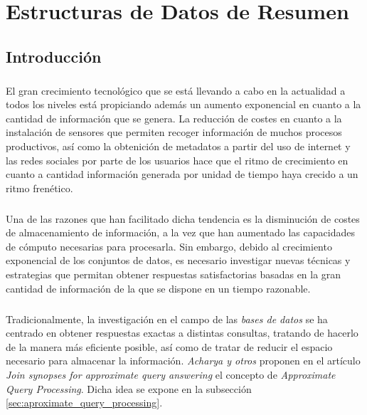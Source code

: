 \documentclass{subfiles}
\begin{document}
  \chapter{Estructuras de Datos de Resumen}
  \label{chapter:summaries}

    \section{Introducción}
    \label{sec:summaries_intro}

      \paragraph{}
      El gran crecimiento tecnológico que se está llevando a cabo en la actualidad a todos los niveles está propiciando además un aumento exponencial en cuanto a la cantidad de información que se genera. La reducción de costes en cuanto a la instalación de sensores que permiten recoger información de muchos procesos productivos, así como la obtenición de metadatos a partir del uso de internet y las redes sociales por parte de los usuarios hace que el ritmo de crecimiento en cuanto a cantidad información generada por unidad de tiempo haya crecido a un ritmo frenético.

      \paragraph{}
      Una de las razones que han facilitado dicha tendencia es la disminución de costes de almacenamiento de información, a la vez que han aumentado las capacidades de cómputo necesarias para procesarla. Sin embargo, debido al crecimiento exponencial de los conjuntos de datos, es necesario investigar nuevas técnicas y estrategias que permitan obtener respuestas satisfactorias basadas en la gran cantidad de información de la que se dispone en un tiempo razonable.

      \paragraph{}
      Tradicionalmente, la investigación en el campo de las \emph{bases de datos} se ha centrado en obtener respuestas exactas a distintas consultas, tratando de hacerlo de la manera más eficiente posible, así como de tratar de reducir el espacio necesario para almacenar la información. \emph{Acharya y otros} proponen en el artículo \emph{Join synopses for approximate query answering} \cite{acharya1999join} el concepto de \emph{Approximate Query Processing}. Dicha idea se expone en la subsección \ref{sec:aproximate_query_processing}.
\end{document}
